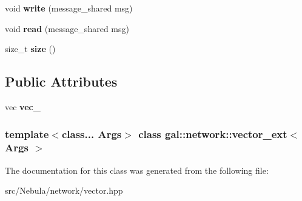 \begin{DoxyCompactItemize}
\item 
\hypertarget{classgal_1_1network_1_1vector__ext_ab6231dbee5d3773f8e6c6a2099686013}{void {\bfseries write} (message\-\_\-shared msg)}\label{classgal_1_1network_1_1vector__ext_ab6231dbee5d3773f8e6c6a2099686013}

\item 
\hypertarget{classgal_1_1network_1_1vector__ext_aca9774537b3edb25bb1fbb083aba630a}{void {\bfseries read} (message\-\_\-shared msg)}\label{classgal_1_1network_1_1vector__ext_aca9774537b3edb25bb1fbb083aba630a}

\item 
\hypertarget{classgal_1_1network_1_1vector__ext_a3c2f72e7208a18ccea1aa2f0b87985e2}{size\-\_\-t {\bfseries size} ()}\label{classgal_1_1network_1_1vector__ext_a3c2f72e7208a18ccea1aa2f0b87985e2}

\end{DoxyCompactItemize}
\subsection*{\-Public \-Attributes}
\begin{DoxyCompactItemize}
\item 
\hypertarget{classgal_1_1network_1_1vector__ext_ac14af4fb2f11ce5fe177384c10ea9f31}{vec {\bfseries vec\-\_\-}}\label{classgal_1_1network_1_1vector__ext_ac14af4fb2f11ce5fe177384c10ea9f31}

\end{DoxyCompactItemize}
\subsubsection*{template$<$class... \-Args$>$ class gal\-::network\-::vector\-\_\-ext$<$ Args $>$}



\-The documentation for this class was generated from the following file\-:\begin{DoxyCompactItemize}
\item 
src/\-Nebula/network/vector.\-hpp\end{DoxyCompactItemize}
